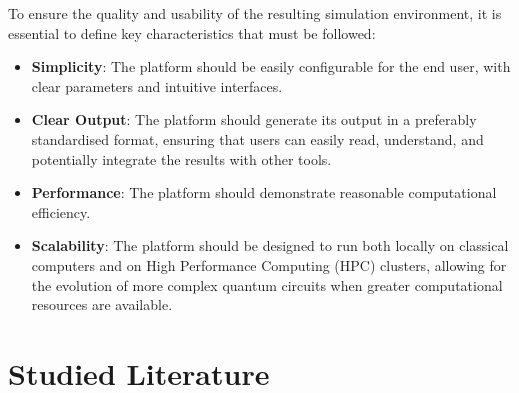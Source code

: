 To ensure the quality and usability of the resulting simulation environment, it is essential to define key characteristics that must be followed:
\begin{itemize}
    \item \textbf{Simplicity}: The platform should be easily configurable for the end user, with clear parameters and intuitive interfaces.
    \item \textbf{Clear Output}: The platform should generate its output in a preferably standardised format, ensuring that users can easily read, understand, and potentially integrate the results with other tools.
    \item \textbf{Performance}: The platform should demonstrate reasonable computational efficiency.
    \item \textbf{Scalability}: The platform should be designed to run both locally on classical computers and on High Performance Computing (HPC) clusters, allowing for the evolution of more complex quantum circuits when greater computational resources are available.
\end{itemize}

\section{Studied Literature}

\nocite{*}
\printbibliography[env=nolabelbib, keyword={lit}, heading=none]

